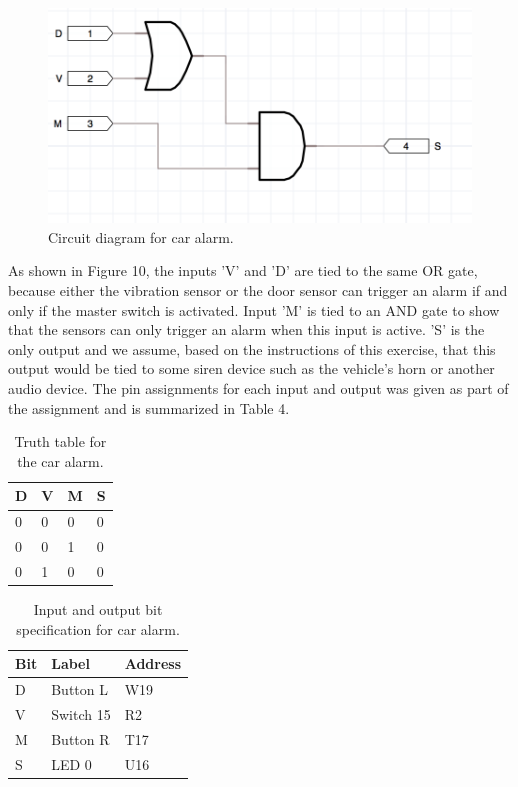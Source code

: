 \documentclass[11pt]{article}
\begin{document}
\begin{figure}[h]
	\includegraphics[width=\textwidth]{report_images/img2}
	\caption{\label{fig:figure-name}Circuit diagram for car alarm.}
\end{figure}

As shown in Figure 10, the inputs 'V' and 'D' are tied to the same OR gate, because either the vibration sensor or the door sensor can trigger an alarm if and only if the master switch is activated. Input 'M' is tied to an AND gate to show that the sensors can only trigger an alarm when this input is active. 'S' is the only output and we assume, based on the instructions of this exercise, that this output would be tied to some siren device such as the vehicle's horn or another audio device. The pin assignments for each input and output was given as part of the assignment and is summarized in Table 4.

\begin{table}[h]
\begin{center}
	\begin{tabular}{| l | l | l | l |}
	\hline
	D & V & M & S \\ \hline
	0 & 0 & 0 & 0 \\ \hline
	0 & 0 & 1 & 0 \\ \hline
	0 & 1 & 0 & 0 \\ \hline	
	\end{tabular}
	\caption{\label{tab:table-name}Truth table for the car alarm.}
\end{center}
\end{table}

\begin{table}[h]
\begin{center}
	\begin{tabular}{| l | l | l |}
		\hline
		Bit & Label & Address \\ \hline
		D & Button L & W19 \\ \hline
		V & Switch 15 & R2 \\ \hline
		M & Button R & T17 \\ \hline
		S & LED 0 & U16 \\ \hline
	\end{tabular}
	\caption{\label{tab:table-name}Input and output bit specification for car alarm.}
\end{center}	
\end{table}
\end{document}
